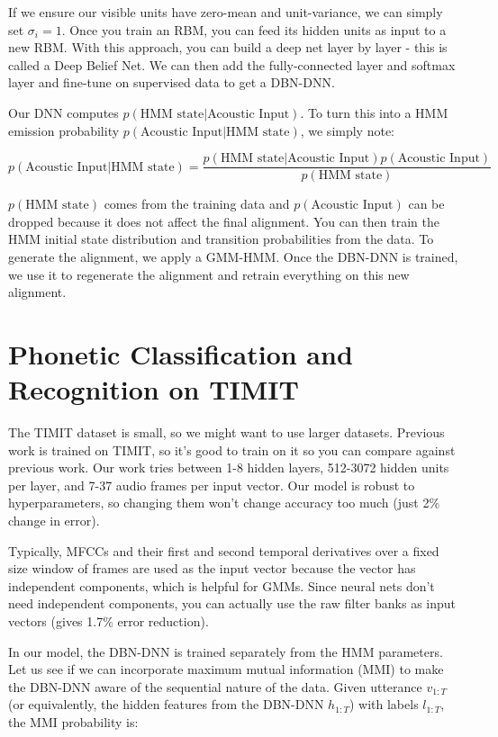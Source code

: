 \documentclass[a4paper]{article}
\begin{document}
If we ensure our visible units have zero-mean and unit-variance, we can simply
set $\sigma_i = 1$. Once you train an RBM, you can feed its hidden units as
input to a new RBM. With this approach, you can build a deep net layer by layer
- this is called a Deep Belief Net. We can then add the fully-connected layer
and softmax layer and fine-tune on supervised data to get a DBN-DNN.

Our DNN computes $p(\text{HMM state} | \text{Acoustic Input})$. To turn this
into a HMM emission probability $p(\text{Acoustic Input} | \text{HMM state})$,
we simply note:

$$
p(\text{Acoustic Input} | \text{HMM state}) =
\frac{p(\text{HMM state} | \text{Acoustic Input}) p(\text{Acoustic Input})}{
p(\text{HMM state})}
$$

$p(\text{HMM state})$ comes from the training data and
$p(\text{Acoustic Input})$ can be dropped because it does not affect the
final alignment. You can then train the HMM initial state distribution and
transition probabilities from the data. To generate the alignment, we apply
a GMM-HMM. Once the DBN-DNN is trained, we use it to regenerate the
alignment and retrain everything on this new alignment.

\section{Phonetic Classification and Recognition on TIMIT}
The TIMIT dataset is small, so we might want to use larger datasets. Previous
work is trained on TIMIT, so it's good to train on it so you can compare 
against previous work. Our work tries between 1-8 hidden layers, 512-3072
hidden units per layer, and 7-37 audio frames per input vector. Our model
is robust to hyperparameters, so changing them won't change accuracy too much
(just 2\% change in error).

Typically, MFCCs and their first and second temporal derivatives over a fixed
size window of frames are used as the input vector because the vector has
independent components, which is helpful for GMMs. Since neural nets don't need
independent components, you can actually use the raw filter banks as input
vectors (gives 1.7\% error reduction).

In our model, the DBN-DNN is trained separately from the HMM parameters. Let us
see if we can incorporate maximum mutual information (MMI) to make the DBN-DNN
aware of the sequential nature of the data. Given utterance $v_{1:T}$ (or
equivalently, the hidden features from the DBN-DNN $h_{1:T}$)
with labels $l_{1:T}$, the MMI probability is:
\end{document}
